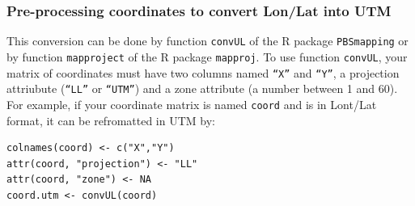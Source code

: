 \documentclass[a4paper,10pt]{article}
\begin{document}








\subsubsection{Pre-processing coordinates to convert Lon/Lat into UTM} 

This conversion can be done by function {\tt convUL} of the R package {\tt PBSmapping} or by function {\tt mapproject}  
of the R package {\tt mapproj}.
To use function {\tt convUL}, your matrix of coordinates must have two columns named  {\tt ``X''} and  
{\tt ``Y''}, a projection attriubute ({\tt ``LL''} or {\tt ``UTM''}) and a zone attribute (a number between 1 and 60). 
For example, if your coordinate matrix is named {\tt coord} and is in Lont/Lat format, it can be refromatted in UTM by:

\begin{verbatim}
colnames(coord) <- c("X","Y")
attr(coord, "projection") <- "LL"
attr(coord, "zone") <- NA 
coord.utm <- convUL(coord)
\end{verbatim}
\end{document}
